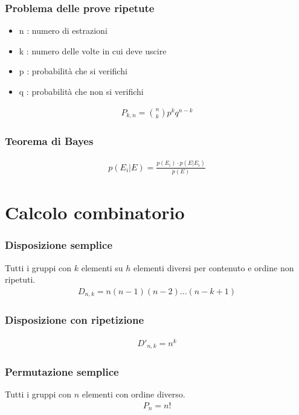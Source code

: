\documentclass[a4paper]{article}
\begin{document}
	\subsubsection*{Problema delle prove ripetute}
	\begin{itemize}
		\item n : numero di estrazioni
		\item k : numero delle volte in cui deve uscire
		\item p : probabilità che si verifichi
		\item q : probabilità che non si verifichi
	\end{itemize}

	\begin{align*}
		P_{k,n} = {{n}\choose{k}} p^kq^{n-k}
	\end{align*}
	
	\subsubsection*{Teorema di Bayes}
	\begin{align*}
		p(E_i|E)= \frac{p(E_i) \cdot p(E | E_i)}{p(E)}
	\end{align*}
	
	\newpage
	\section{Calcolo combinatorio}
	\subsubsection*{Disposizione semplice}
	Tutti i gruppi con $k$ elementi su $h$ elementi diversi per contenuto e ordine non ripetuti.
	\begin{align*}
		D_{n,k} = n(n-1)(n-2)...(n-k+1)
	\end{align*}

	\subsubsection*{Disposizione con ripetizione}
	\begin{align*}
		D'_{n,k} = n^k
	\end{align*}

	\subsubsection*{Permutazione semplice}
	Tutti i gruppi con $n$ elementi con ordine diverso.
	\begin{align*}
		P_n = n! 
	\end{align*}
	
\end{document}
